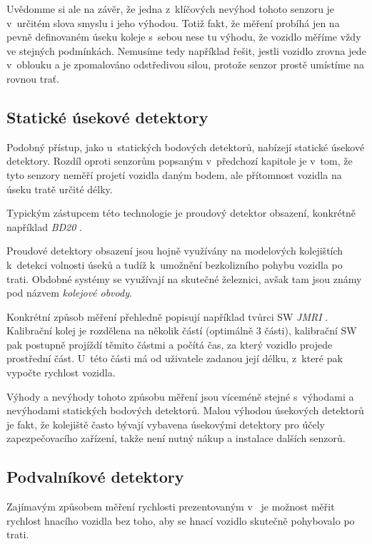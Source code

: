 \documentclass[12pt,a4paper]{article}
\begin{document}
Uvědomme si ale na závěr, že jedna z~klíčových nevýhod tohoto senzoru je
v~určitém slova smyslu i jeho výhodou. Totiž fakt, že měření probíhá jen na pevně
definovaném úseku koleje s~sebou nese tu výhodu, že vozidlo měříme vždy ve
stejných podmínkách. Nemusíme tedy například řešit, jestli vozidlo zrovna jede
v~oblouku a je zpomalováno odstředivou silou, protože senzor prostě umístíme
na rovnou trať.

\subsection{Statické úsekové detektory}

Podobný přístup, jako u~statických bodových detektorů, nabízejí statické
úsekové detektory. Rozdíl oproti senzorům popsaným v~předchozí kapitole je
v~tom, že tyto senzory neměří projetí vozidla daným bodem, ale přítomnost vozidla
na úseku tratě určité délky.

Typickým zástupcem této technologie je proudový detektor obsazení, konkrétně
například \textit{BD20} \cite{bd20}.

Proudové detektory obsazení jsou hojně využívány na modelových kolejištích k~detekci
volnosti úseků a tudíž k~umožnění bezkolizního pohybu vozidla po trati.
Obdobné systémy se využívají na skutečné železnici, avšak tam jsou známy pod
názvem \textit{kolejové obvody}.

Konkrétní způsob měření přehledně popisují například tvůrci SW \textit{JMRI}
\cite{jmri:speedometer}.
Kalibrační kolej je rozdělena na několik částí (optimálně 3 části), kalibrační
SW pak postupně projíždí těmito částmi a počítá čas, za který vozidlo projede
prostřední část. U~této části má od uživatele zadanou její délku, z~které pak
vypočte rychlost vozidla.

Výhody a nevýhody tohoto způsobu měření jsou víceméně stejné s~výhodami a
nevýhodami statických bodových detektorů. Malou výhodou úsekových detektorů je
fakt, že kolejiště často bývají vybavena úsekovými detektory pro účely
zapezpečovacího zařízení, takže není nutný nákup a instalace dalších senzorů.

\subsection{Podvalníkové detektory}

Zajímavým způsobem měření rychlosti prezentovaným v~\cite{bachrus}
je možnost měřit rychlost hnacího vozidla bez toho, aby se hnací vozidlo
skutečně pohybovalo po trati.
\end{document}
